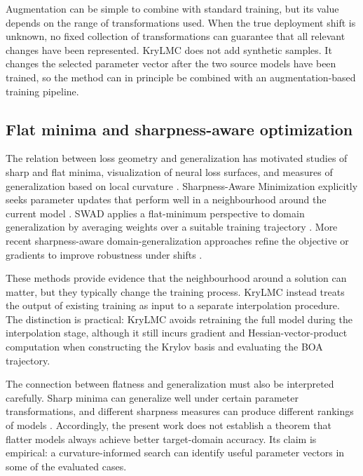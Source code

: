 \documentclass[11pt,a4paper]{article}
\begin{document}
Augmentation can be simple to combine with standard training, but its value depends on the range of transformations used. When the true deployment shift is unknown, no fixed collection of transformations can guarantee that all relevant changes have been represented. KryLMC does not add synthetic samples. It changes the selected parameter vector after the two source models have been trained, so the method can in principle be combined with an augmentation-based training pipeline.

\subsection{Flat minima and sharpness-aware optimization}
The relation between loss geometry and generalization has motivated studies of sharp and flat minima, visualization of neural loss surfaces, and measures of generalization based on local curvature \cite{li2018visualizing,hochreiter1997flat,keskar2017large,jiang2020fantastic}. Sharpness-Aware Minimization explicitly seeks parameter updates that perform well in a neighbourhood around the current model \cite{foret2021sharpness}. SWAD applies a flat-minimum perspective to domain generalization by averaging weights over a suitable training trajectory \cite{cha2021swad}. More recent sharpness-aware domain-generalization approaches refine the objective or gradients to improve robustness under shifts \cite{wang2023sagm,li2025consistent,song2025dgsam}.

These methods provide evidence that the neighbourhood around a solution can matter, but they typically change the training process. KryLMC instead treats the output of existing training as input to a separate interpolation procedure. The distinction is practical: KryLMC avoids retraining the full model during the interpolation stage, although it still incurs gradient and Hessian-vector-product computation when constructing the Krylov basis and evaluating the BOA trajectory.

The connection between flatness and generalization must also be interpreted carefully. Sharp minima can generalize well under certain parameter transformations, and different sharpness measures can produce different rankings of models \cite{dinh2017sharp,wen2023sharpness,zhang2021flatness}. Accordingly, the present work does not establish a theorem that flatter models always achieve better target-domain accuracy. Its claim is empirical: a curvature-informed search can identify useful parameter vectors in some of the evaluated cases.
\end{document}
